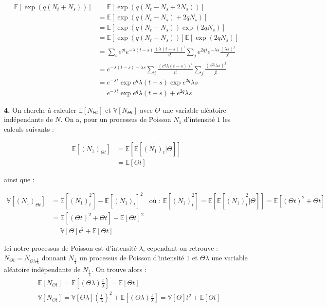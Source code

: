 \documentclass[a4paper,10pt]{report}
\newcommand{\esp}[1]{\mathbb{E}\left[#1\right]} %
\newcommand{\Var}[1]{\mathbb{V} \left[#1\right]} %
\begin{document}
$$
\begin{aligned}
\mathbb{E}\left[\exp \left(q\left(N_{t}+N_{s}\right)\right)\right] & = \mathbb{E}\left[\exp \left(q\left(N_{t} - N_s + 2N_{s}\right)\right)\right] \\
& = \mathbb{E}\left[\exp \left(q\left(N_{t} - N_s\right)  + 2qN_{s}\right)\right] \\
& = \mathbb{E}\left[\exp \left(q\left(N_{t} - N_s\right) \right) \exp \left(2qN_{s}\right)\right] \\
& = \mathbb{E}\left[\exp \left(q\left(N_{t} - N_s\right) \right)\right] \mathbb{E}\left[\exp \left(2qN_{s}\right)\right] \\
& = \sum_i e^{qi} e^{-\lambda (t -s)} \frac{(\lambda(t-s))^i}{i !} \sum_j e^{2qj} e^{-\lambda s} \frac{(\lambda s)^j}{j !} \\
& = e^{-\lambda (t -s) -\lambda s} \sum_i \frac{(e^q \lambda(t-s))^i}{i !} \sum_j \frac{(e^{2q} \lambda s)^j}{j !} \\
& = e^{-\lambda t} \exp{e^{q} \lambda (t-s)} \exp{e^{2q} \lambda s} \\
& = e^{-\lambda t} \exp{e^{q} \lambda (t-s) + e^{2q} \lambda s}
\end{aligned}
$$
\newline


\textbf{4.} On cherche à calculer $\esp{N_{\Theta t}}$ et $\Var{N_{\Theta t}}$ avec $\Theta$ une variable aléatoire indépendante de $N$.
On a, pour un processus de Poisson $N_1$ d'intensité $1$ les calculs suivants :  

$$
\begin{aligned}
\esp{(N_1)_{\Theta t}} & = \esp{\esp{\tilde{{(N_1)}_t} | \Theta}} \\
& = \esp{\Theta t}
\end{aligned}
$$

ainsi que : 

$$
\begin{aligned}
\Var{(N_1)_{\Theta t}} & = \esp{\tilde{(N_1)}_{t}^{2}}-\esp{\tilde{(N_1)}_{t}}^2 & \text{où : } \esp{\tilde{(N_1)}_{t}^{2}} = \esp{\esp{\tilde{(N_1)}_{t}^{2} | \Theta}} = \esp{(\Theta t)^{2}+\Theta t}\\
& = \esp{(\Theta t)^2+\Theta t} - \esp{\Theta t}^2 \\
& = \Var{\Theta}t^2 + \esp{\Theta t}
\end{aligned}
$$

Ici notre processus de Poisson est d'intensité $\lambda$, cependant on retrouve : $N_{\Theta t} = N_{\Theta \lambda \frac{t}{\lambda}}$ donnant $N_{\frac{t}{\lambda}}$ un processus de Poisson d'intensité $1$ et $\Theta\lambda$ une variable aléatoire indépendante de $N_{\frac{t}{\lambda}}$. On trouve alors :
$$
\begin{aligned}
& \esp{N_{\Theta t}} = \esp{(\Theta \lambda) \frac{t}{\lambda}} = \esp{\Theta t}\\
& \Var{N_{\Theta t}} = \Var{\Theta \lambda}\left(\frac{t}{\lambda}\right)^2 + \esp{(\Theta \lambda) \frac{t}{\lambda}} = \Var{\Theta}t^2 + \esp{\Theta t}
\end{aligned}
$$
\end{document}
